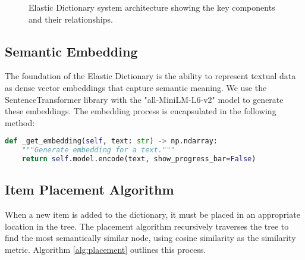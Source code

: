 \documentclass[conference]{IEEEtran}
\begin{document}
\begin{figure}[ht]
\centering
{}
\caption{Elastic Dictionary system architecture showing the key components and their relationships.}
\label{fig:architecture}
\end{figure}

\subsection{Semantic Embedding}

The foundation of the Elastic Dictionary is the ability to represent textual data as dense vector embeddings that capture semantic meaning. We use the SentenceTransformer library with the "all-MiniLM-L6-v2" model to generate these embeddings. The embedding process is encapsulated in the following method:

\begin{lstlisting}[language=Python]
def _get_embedding(self, text: str) -> np.ndarray:
    """Generate embedding for a text."""
    return self.model.encode(text, show_progress_bar=False)
\end{lstlisting}

\subsection{Item Placement Algorithm}

When a new item is added to the dictionary, it must be placed in an appropriate location in the tree. The placement algorithm recursively traverses the tree to find the most semantically similar node, using cosine similarity as the similarity metric. Algorithm \ref{alg:placement} outlines this process.
\end{document}
